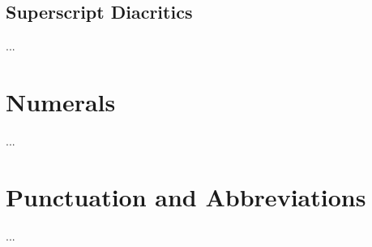 \subsection{Superscript Diacritics}

...

\section{Numerals}

...

\section{Punctuation and Abbreviations}

...


